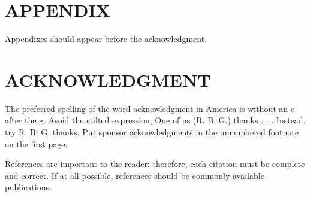 \documentclass[letterpaper, 10 pt, conference]{ieeeconf}  %
\begin{document}






\section*{APPENDIX}

Appendixes should appear before the acknowledgment.

\section*{ACKNOWLEDGMENT}

The preferred spelling of the word acknowledgment in America is without an e after the g. Avoid the stilted expression, One of us (R. B. G.) thanks . . .  Instead, try R. B. G. thanks. Put sponsor acknowledgments in the unnumbered footnote on the first page.




References are important to the reader; therefore, each citation must be complete and correct. If at all possible, references should be commonly available publications.

\printbibliography
\end{document}
